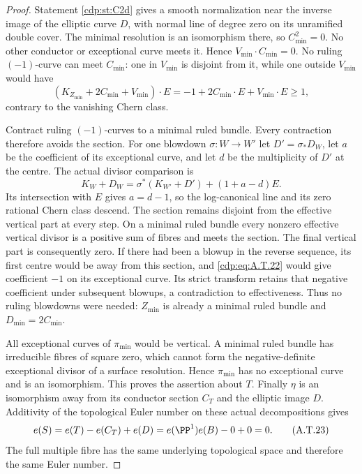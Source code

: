 \begin{proof}
Statement \ref{cdp:st:C2d} gives a smooth normalization near the
inverse image of the elliptic curve $D$, with normal
line of degree zero on its unramified double cover.
The minimal resolution is an isomorphism there, so
$C_{\min}^2=0$. No other conductor or exceptional
curve meets it. Hence $V_{\min}\cdot C_{\min}=0$.
No ruling $(-1)$-curve can meet $C_{\min}$: one in
$V_{\min}$ is disjoint from it, while one outside
$V_{\min}$ would have
\[
 (K_{Z_{\min}}+2C_{\min}+V_{\min})\cdot E
       =-1+2C_{\min}\cdot E+V_{\min}\cdot E\ge1,
\]
contrary to the vanishing Chern class.

Contract ruling $(-1)$-curves to a minimal ruled bundle.
Every contraction therefore avoids the section. For
one blowdown $\sigma:W\to W'$ let $D'=\sigma_*D_W$,
let $a$ be the coefficient of its exceptional curve,
and let $d$ be the multiplicity of $D'$ at the centre.
The actual divisor comparison is
\[
 K_W+D_W=\sigma^*(K_{W'}+D')+(1+a-d)E.
                                                        \tag{A.T.22}\label{cdp:eq:A.T.22}
\]
Its intersection with $E$ gives $a=d-1$, so the
log-canonical line and its zero rational Chern class
descend. The section remains disjoint from the
effective vertical part at every step. On a minimal
ruled bundle every nonzero effective vertical divisor
is a positive sum of fibres and meets the section.
The final vertical part is consequently zero. If
there had been a blowup in the reverse sequence,
its first centre would be away from this section,
and \eqref{cdp:eq:A.T.22} would give coefficient $-1$ on its
exceptional curve. Its strict transform retains that
negative coefficient under subsequent blowups, a
contradiction to effectiveness. Thus no ruling
blowdowns were needed: $Z_{\min}$ is already a
minimal ruled bundle and $D_{\min}=2C_{\min}$.

All exceptional curves of $\pi_{\min}$ would be
vertical. A minimal ruled bundle has irreducible
fibres of square zero, which cannot form the
negative-definite exceptional divisor of a surface
resolution. Hence $\pi_{\min}$ has no exceptional
curve and is an isomorphism. This proves the assertion
about $T$. Finally $\eta$ is an isomorphism away from
its conductor section $C_T$ and the elliptic image
$D$. Additivity of the topological Euler number on
these actual decompositions gives
\[
 e(S)=e(T)-e(C_T)+e(D)
      =e(\PP^1)e(B)-0+0=0.                       \tag{A.T.23}\label{cdp:eq:A.T.23}
\]
The full multiple fibre has the same underlying
topological space and therefore the same Euler number.
\end{proof}

